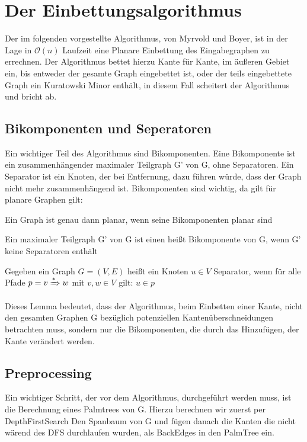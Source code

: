 \documentclass[runningheads]{llncs}
\begin{document}
\section{Der Einbettungsalgorithmus}
    Der im folgenden vorgestellte Algorithmus, von Myrvold und Boyer, ist in der Lage in $\mathcal{O}(n)$ Laufzeit eine Planare Einbettung
    des Eingabegraphen zu errechnen. Der Algorithmus bettet hierzu Kante für Kante, im äußeren Gebiet ein, bis entweder der gesamte Graph eingebettet ist, oder
    der teils eingebettete Graph ein Kuratowski Minor enthält, in diesem Fall scheitert der Algorithmus und bricht ab.
    
    \subsection{Bikomponenten und Seperatoren}
    Ein wichtiger Teil des Algorithmus sind Bikomponenten. Eine Bikomponente ist ein zusammenhängender maximaler Teilgraph G' von G, ohne Separatoren.
    Ein Separator ist ein Knoten, der bei Entfernung, dazu führen würde, dass der Graph nicht mehr zusammenhängend ist. Bikomponenten sind wichtig, da gilt für planare Graphen gilt:

    \begin{lemma}
        Ein Graph ist genau dann planar, wenn seine Bikomponenten planar sind
    \end{lemma}
    \begin{definition}[Bikomponente]
        Ein  maximaler Teilgraph G' von G ist einen heißt Bikomponente von G, wenn G' keine Separatoren enthält
    \end{definition}
    \begin{definition}[Separator]
        Gegeben ein Graph $G=(V,E)$ heißt ein Knoten $u \in V$ Separator, wenn für alle Pfade $p = v \xRightarrow{*} w$ mit $v,w \in V$
        gilt: $u \in p$
    \end{definition}
    Dieses Lemma bedeutet, dass der Algorithmus, beim Einbetten einer Kante, nicht den gesamten Graphen G bezüglich potenziellen Kantenüberschneidungen 
    betrachten muss, sondern nur die Bikomponenten, die durch das Hinzufügen, der Kante verändert werden.

    \subsection{Preprocessing}
    Ein wichtiger Schritt, der vor dem Algorithmus, durchgeführt werden muss, 
    ist die Berechnung eines Palmtrees von G. Hierzu berechnen wir zuerst per DepthFirstSearch 
    Den Spanbaum von G und fügen danach die Kanten die nicht wärend des DFS durchlaufen wurden, als BackEdges in den PalmTree ein. 
\end{document}
